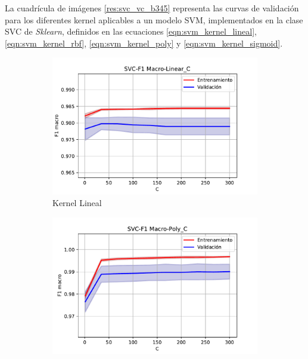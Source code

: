 La cuadrícula de imágenes \ref{res:svc_vc_b345} representa las curvas de validación para los diferentes kernel aplicables a un modelo SVM, implementados en la clase SVC de \textit{Sklearn}, definidos en las ecuaciones \ref{eqn:svm_kernel_lineal}, \ref{eqn:svm_kernel_rbf}, \ref{eqn:svm_kernel_poly} y \ref{eqn:svm_kernel_sigmoid}.

\begin{figure}[H]
	\captionsetup{justification=centering}
	\centering
	\begin{subfigure}[b]{.45\linewidth}
		\includegraphics[width=\linewidth]{imagenes/resultados/svm/curvas_validacion/b345/SVC-F1 Macro-linear_C.pdf}
		\caption{Kernel Lineal}
		\label{res:svc_vc_lineal_b345}
	\end{subfigure}
	\begin{subfigure}[b]{.45\linewidth}
		\includegraphics[width=\linewidth]{imagenes/resultados/svm/curvas_validacion/b345/SVC-F1 Macro-poly_C.pdf}

\end{subfigure}
\end{figure}

